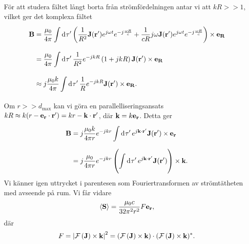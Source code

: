För att studera fältet långt borta från strömfördelningen antar vi att $kR >> 1$, vilket ger det komplexa fältet
\begin{align*}
	\vb{B} &= \frac{\mu_{0}}{4\pi}\int\limits_{}^{}\dd[]{\tau'}\left(\frac{1}{R^{2}}\vb{J}(\vb{r}')e^{j\omega t}e^{-j\frac{\omega R}{c}} + \frac{1}{cR}j\omega\vb{J}(\vb{r}')e^{j\omega t}e^{-j\frac{\omega R}{c}}\right)\times\vb{e}_{\vb{R}} \\
	       &= \frac{\mu_{0}}{4\pi}\int\limits_{}^{}\dd[]{\tau'}\frac{1}{R^{2}}e^{-jkR}\left(1 + jkR\right)\vb{J}(\vb{r}')\times\vb{e}_{\vb{R}} \\
	       &\approx j\frac{\mu_{0}k}{4\pi}\int\limits_{}^{}\dd[]{\tau'}\frac{1}{R}e^{-jkR}\vb{J}(\vb{r}')\times\vb{e}_{\vb{R}}.
\end{align*}
Om $r >> d_{\text{max}}$ kan vi göra en parallelliseringsansats $kR \approx k(r - \vb{e}_{\vb{r}}\cdot\vb{r}') = kr - \vb{k}\cdot\vb{r}'$, där $\vb{k} = k\vb{e}_{\vb{r}}$. Detta ger
\begin{align*}
	\vb{B} &= j\frac{\mu_{0}k}{4\pi r}e^{-jkr}\int\limits_{}^{}\dd[]{\tau'}e^{j\vb{k}\cdot\vb{r}'}\vb{J}(\vb{r}')\times\vb{e}_{\vb{r}} \\
	       &= j\frac{\mu_{0}}{4\pi r}e^{-jkr}\left(\int\limits_{}^{}\dd[]{\tau'}e^{j\vb{k}\cdot\vb{r}'}\vb{J}(\vb{r}')\right)\times\vb{k}.
\end{align*}
Vi känner igen uttrycket i parentesen som Fouriertransformen av strömtätheten med avseende på rum. Vi får vidare
\begin{align*}
	\expval{\vb{S}} = \frac{\mu_{0}c}{32\pi^{2}r^{2}}F\vb{e}_{\vb{r}},
\end{align*}
där
\begin{align*}
	F = \abs{\mathcal{F}\left(\vb{J}\right)\times\vb{k}}^{2} = (\mathcal{F}\left(\vb{J}\right)\times\vb{k})\cdot(\mathcal{F}\left(\vb{J}\right)\times\vb{k})^{*}.
\end{align*}